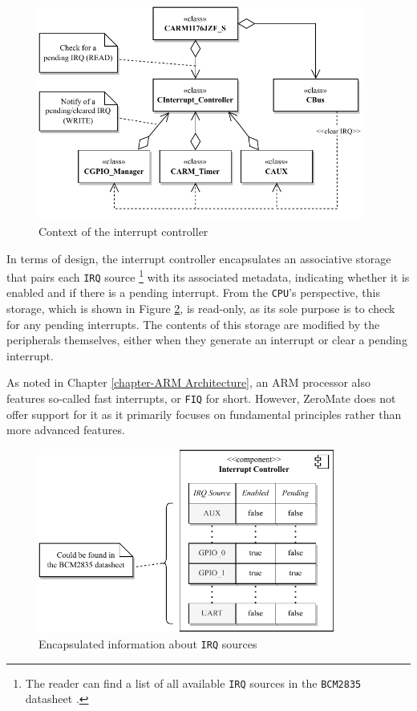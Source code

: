 \documentclass[english, ing, kiv, he, iso690numb, pdf]{fasthesis}
\begin{document}
	\begin{figure}[ht]
		\centering
		\includegraphics[width=0.95\textwidth]{img/diagrams/interrupt_controller.pdf}
		\caption{Context of the interrupt controller}
		\label{Context of the interrupt controller}
	\end{figure}
	
	In terms of design, the interrupt controller encapsulates an associative storage that pairs each \texttt{IRQ} source \footnote{The reader can find a list of all available \texttt{IRQ} sources in the \texttt{BCM2835} datasheet \cite{BCM2835}.} with its associated metadata, indicating whether it is enabled and if there is a pending interrupt. From the \texttt{CPU}'s perspective, this storage, which is shown in Figure \ref{Encapsulated information about IRQ sources}, is read-only, as its sole purpose is to check for any pending interrupts. The contents of this storage are modified by the peripherals themselves, either when they generate an interrupt or clear a pending interrupt.
	
	\begin{important}
		As noted in Chapter \ref{chapter-ARM Architecture}, an ARM processor also features so-called fast interrupts, or \texttt{FIQ} for short. However, ZeroMate does not offer support for it as it primarily focuses on fundamental principles rather than more advanced features.
	\end{important}
	
	\newpage
	
	\begin{figure}[ht]
		\centering
		\includegraphics[width=0.87\textwidth]{img/diagrams/irq_sources.pdf}
		\caption{Encapsulated information about \texttt{IRQ} sources}
		\label{Encapsulated information about IRQ sources}
	\end{figure}
	
\end{document}

